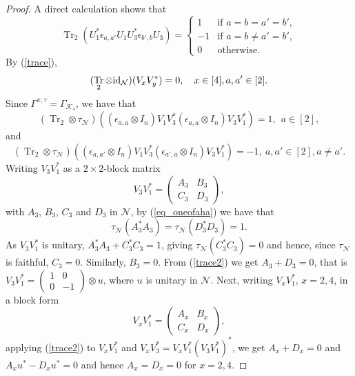 \documentclass[11pt]{amsart}
\theoremstyle{definition}
\DeclareMathOperator{\tr}{Tr}
\newcommand{\cl}[1]{\mathcal{#1}}
\DeclareMathOperator{\Tr}{Tr}
\newcommand{\C}{\mathbb{C}}
\begin{document}
\begin{proof}
A direct calculation shows that 
$$\Tr_2(U_1^*\epsilon_{a,a'}U_1U_3^*\epsilon_{b',b}U_3)=\left\{\begin{array}{ll}
1 & \text{if } a=b=a'=b',\\
-1 & \text{if } a=b\ne a'=b', \\
0& \text{otherwise.}
\end{array}\right.$$
By (\ref{trace}),  
\begin{equation}\label{trace2}
(\tr_2\otimes{\rm id}_{\cl N})(V_{x}V_{y}^*)=0, 
\ \ \ x\in [4], a,a'\in [2].
\end{equation}
Since $\Gamma^{\pi,\tau} = \Gamma_{\cl K_4}$, we have that 
\begin{equation}\label{eq_oneofaha}
(\Tr_{2}\otimes\tau_{\cl N})((\epsilon_{a,a}\otimes I_n)V_{1}V_{3}^*(\epsilon_{a,a}\otimes I_n)V_{3}V_{1}^*)=1, 
\ \ a\in [2], 
\end{equation}
and 
$$(\Tr_2\otimes\tau_{\cl N})((\epsilon_{a,a'}\otimes I_n)V_{1}V_{3}^*(\epsilon_{a',a}\otimes I_n)V_{3}V_{1}^*)=-1, 
\  a,a'\in [2], a\neq a'.$$
Writing $V_{3}V_{1}^*$ as a $2\times 2$-block matrix $$V_{3}V_{1}^*=\left(\begin{array}{cc}A_{3}&B_{3}\\C_{3}&D_{3}\end{array}\right),$$
with $A_3$, $B_3$, $C_3$ and $D_3$ in $\cl N$, 
by (\ref{eq_oneofaha}) 
we have that
$$\tau_{\cl N}(A_{3}^*A_{3})=\tau_{\cl N}(D_{3}^*D_{3})=1.$$ 
As $V_{3}V_{1}^*$ is unitary, 
$A_{3}^*A_{3}+C_{3}^*C_{3}=1$, giving 
$\tau_{\cl N}(C_{3}^*C_{3})=0$ and hence, since $\tau_{\cl N}$ is faithful, $C_{3}=0$. Similarly, $B_{3}=0$.  
From (\ref{trace2}) we get $A_{3}+D_{3}=0$, that is  $V_{3}V_{1}^*=\left(\begin{array}{cc}1&0\\0&-1\end{array}\right)\otimes u$, where $u$ is unitary in $\cl N$. 
Next, writing $V_{x}V_{1}^*$, $x=2,4$, in a block form
$$V_{x}V_{1}^*=\left(\begin{array}{cc}A_{x}&B_{x}\\C_{x}&D_{x}\end{array}\right),$$
applying (\ref{trace2}) to $V_{x}V_{1}^*$ and $V_{x}V_{3}^*=V_{x}V_{1}^*(V_{3}V_{1}^*)^*$, we get $A_{x}+D_{x}=0$ and 
$A_{x}u^*-D_{x}u^*=0$ and hence $A_{x}=D_{x}=0$ for $x=2,4$.


\end{proof}
\end{document}
